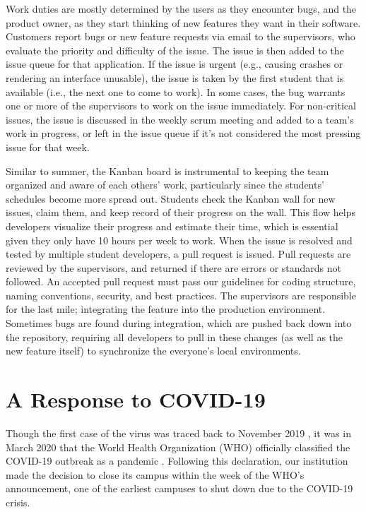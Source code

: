 Work duties are mostly determined by the users as they encounter bugs, and the product owner, as they start thinking of new features they want in their software. Customers report bugs or new feature requests via email to the supervisors, who evaluate the priority and difficulty of the issue. The issue is then added to the issue queue for that application. If the issue is urgent (e.g., causing crashes or rendering an interface unusable), the issue is taken by the first student that is available (i.e., the next one to come to work). In some cases, the bug warrants one or more of the supervisors to work on the issue immediately. For non-critical issues, the issue is discussed in the weekly scrum meeting and added to a team's work in progress, or left in the issue queue if it's not considered the most pressing issue for that week.

Similar to summer, the Kanban board is instrumental to keeping the team organized and aware of each others' work, particularly since the students' schedules become more spread out. Students check the Kanban wall for new issues, claim them, and keep record of their progress on the wall. This flow helps developers visualize their progress and estimate their time, which is essential given they only have 10 hours per week to work. When the issue is resolved and tested by multiple student developers, a pull request is issued. Pull requests are reviewed by the supervisors, and returned if there are errors or standards not followed. An accepted pull request must pass our guidelines for coding structure, naming conventions, security, and best practices. The supervisors are responsible for the last mile; integrating the feature into the production environment. Sometimes bugs are found during integration, which are pushed back down into the repository, requiring all developers to pull in these changes (as well as the new feature itself) to synchronize the everyone's local environments.



\section{A Response to COVID-19}
Though the first case of the virus was traced back to November 2019 \cite{}, it was in March 2020 that the World Health Organization (WHO) officially classified the COVID-19 outbreak as a pandemic \cite{}. Following this declaration, our institution made the decision to close its campus within the week of the WHO's announcement, one of the earliest campuses to shut down due to the COVID-19 crisis.

